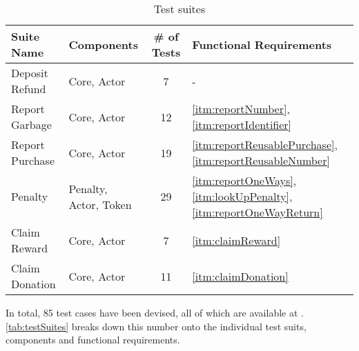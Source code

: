 
\begin{table}[hbt]
	\centering
  	\begin{tabular}{l|l|c|l}
	    Suite Name & Components & \# of Tests & Functional Requirements \\
	    \hline
	    Deposit Refund & Core, Actor & 7 & - \\
	    Report Garbage & Core, Actor & 12 & \ref{itm:reportNumber}, \ref{itm:reportIdentifier} \\
	    Report Purchase & Core, Actor & 19 & \ref{itm:reportReusablePurchase}, \ref{itm:reportReusableNumber} \\
		Penalty & Penalty, Actor, Token & 29 & \ref{itm:reportOneWays}, \ref{itm:lookUpPenalty}, \ref{itm:reportOneWayReturn} \\ 
		Claim Reward & Core, Actor & 7 & \ref{itm:claimReward} \\
		Claim Donation & Core, Actor & 11 & \ref{itm:claimDonation} \\
  	\end{tabular}
  	\caption{Test suites}
  	\label{tab:testSuites}
\end{table}

\FloatBarrier

In total, 85 test cases have been devised, all of which are available at \cite{depositRefundGitHub}. \autoref{tab:testSuites} breaks down this number onto the individual test suits, components and functional requirements.

